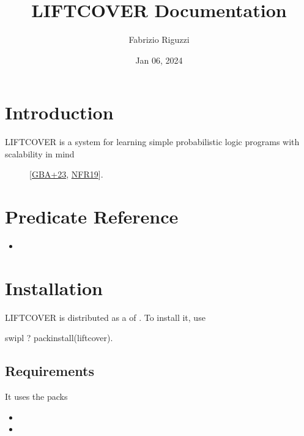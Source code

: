 \documentclass[letterpaper,10pt,english]{sphinxmanual}
\title{LIFTCOVER Documentation}
\date{Jan 06, 2024}
\author{Fabrizio Riguzzi}
\begin{document}
\pagestyle{empty}
\sphinxmaketitle
\pagestyle{plain}
\sphinxtableofcontents
\pagestyle{normal}
\label{\detokenize{index::doc}}



\chapter{Introduction}
\label{\detokenize{index:introduction}}\begin{description}
\item[{LIFTCOVER is a system for learning simple probabilistic logic programs with scalability in mind}] \leavevmode
\sphinxAtStartPar
{[}\hyperlink{cite.index:id7}{GBA+23}, \hyperlink{cite.index:id34}{NFR19}{]}.

\end{description}


\chapter{Predicate Reference}
\label{\detokenize{index:predicate-reference}}\begin{itemize}
\item {} 
\sphinxAtStartPar
{}

\end{itemize}


\chapter{Installation}
\label{\detokenize{index:installation}}
\sphinxAtStartPar
LIFTCOVER is distributed as a  of .
To install it, use

\begin{sphinxVerbatim}[commandchars=\\\{\}]
\PYGZdl{} swipl
?\PYGZhy{} pack\PYGZus{}install(liftcover).
\end{sphinxVerbatim}


\section{Requirements}
\label{\detokenize{index:requirements}}
\sphinxAtStartPar
It uses the packs
\begin{itemize}
\item {} 
\sphinxAtStartPar
{}

\item {} 
\sphinxAtStartPar
{}

\end{itemize}
\end{document}
